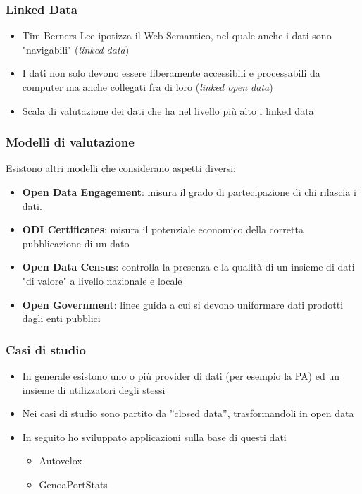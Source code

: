\documentclass{beamer}
\begin{document}
\begin{frame}
\frametitle{Linked Data} 
\begin{itemize}
\item Tim Berners-Lee ipotizza il Web Semantico, nel quale anche i dati sono "navigabili" (\emph{linked data})
\item I dati non solo devono essere liberamente accessibili e processabili da computer ma anche collegati fra di loro (\emph{linked open data})
\item Scala di valutazione dei dati che ha nel livello più alto i linked data
\end{itemize} 
\end{frame}

\begin{frame}
\frametitle{Modelli di valutazione} 
Esistono altri modelli che considerano aspetti diversi:
\begin{itemize}
\item \textbf{Open Data Engagement}: misura il grado di partecipazione di chi rilascia i dati.
\item \textbf{ODI Certificates}: misura il potenziale economico della corretta pubblicazione di un dato
\item \textbf{Open Data Census}: controlla la presenza e la qualità di un insieme di dati "di valore" a livello nazionale e locale
\item \textbf{Open Government}: linee guida a cui si devono uniformare dati prodotti dagli enti pubblici
\end{itemize} 
\end{frame}

\begin{frame}
\frametitle{Casi di studio} 
\begin{itemize}
\item In generale esistono uno o più provider di dati (per esempio la PA) ed un insieme di utilizzatori degli stessi
\item Nei casi di studio sono partito da ''closed data'', trasformandoli in open data
\item In seguito ho sviluppato applicazioni sulla base di questi dati

\begin{itemize}
\item Autovelox
\item GenoaPortStats
\end{itemize}

\end{itemize}
\end{frame}
\end{document}
